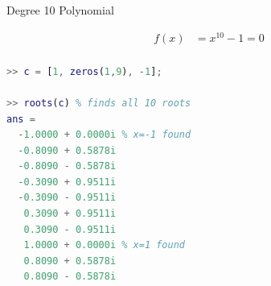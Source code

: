 \documentclass[10pt]{beamer}
\begin{document}
\begin{frame}{Degree 10 Polynomial}

\begin{align*}
    f(x) &= x^{10} - 1 = 0     \\
\end{align*}

\begin{lstlisting}[language=matlab]
>> c = [1, zeros(1,9), -1];

>> roots(c) % finds all 10 roots
ans =
  -1.0000 + 0.0000i % x=-1 found 
  -0.8090 + 0.5878i
  -0.8090 - 0.5878i
  -0.3090 + 0.9511i
  -0.3090 - 0.9511i
   0.3090 + 0.9511i
   0.3090 - 0.9511i
   1.0000 + 0.0000i % x=1 found 
   0.8090 + 0.5878i
   0.8090 - 0.5878i
\end{lstlisting}
\end{frame}
\end{document}
